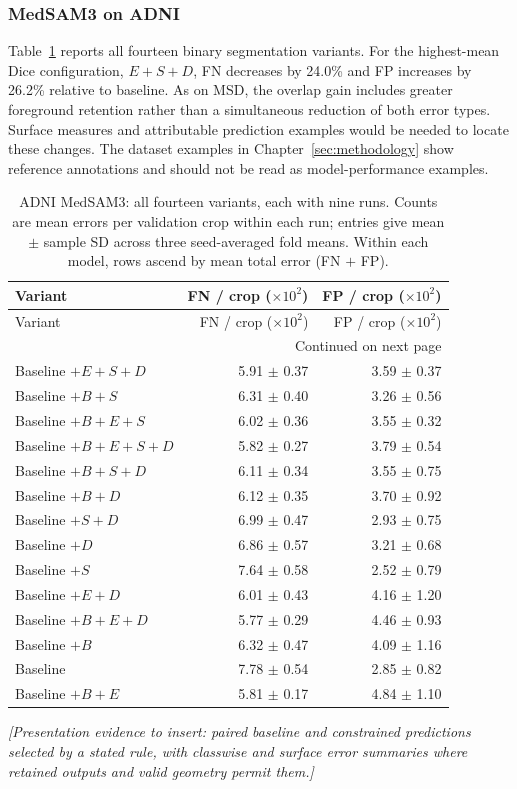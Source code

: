 \subsubsection{MedSAM3 on ADNI}

Table~\ref{tab:medsam-adni-all-errors} reports all fourteen binary
segmentation variants. For the highest-mean Dice configuration,
$E+S+D$, FN decreases by 24.0\% and FP increases by 26.2\% relative
to baseline. As on MSD, the overlap gain includes greater foreground
retention rather than a simultaneous reduction of both error types.
Surface measures and attributable prediction examples would be needed
to locate these changes. The dataset examples in
Chapter~\ref{sec:methodology} show reference annotations and should
not be read as model-performance examples.

\begingroup\footnotesize{}
\setlength{\tabcolsep}{4pt}
\renewcommand{\arraystretch}{1.12}
\begin{longtable}{@{}lrr@{}}
\caption{ADNI MedSAM3: all fourteen variants, each with nine runs. Counts are mean errors per validation crop within each run; entries give mean $\pm$ sample SD across three seed-averaged fold means. Within each model, rows ascend by mean total error (FN $+$ FP).}
\label{tab:medsam-adni-all-errors}\\
\hline
Variant & \shortstack{FN / crop\\($\times 10^{2}$)} & \shortstack{FP / crop\\($\times 10^{2}$)} \\ \hline
\endfirsthead
\hline
Variant & \shortstack{FN / crop\\($\times 10^{2}$)} & \shortstack{FP / crop\\($\times 10^{2}$)} \\ \hline
\endhead
\hline
\multicolumn{3}{r}{Continued on next page}\\
\endfoot
\hline\endlastfoot
Baseline $+E+S+D$ & 5.91 $\pm$ 0.37 & 3.59 $\pm$ 0.37 \\
Baseline $+B+S$ & 6.31 $\pm$ 0.40 & 3.26 $\pm$ 0.56 \\
Baseline $+B+E+S$ & 6.02 $\pm$ 0.36 & 3.55 $\pm$ 0.32 \\
Baseline $+B+E+S+D$ & 5.82 $\pm$ 0.27 & 3.79 $\pm$ 0.54 \\
Baseline $+B+S+D$ & 6.11 $\pm$ 0.34 & 3.55 $\pm$ 0.75 \\
Baseline $+B+D$ & 6.12 $\pm$ 0.35 & 3.70 $\pm$ 0.92 \\
Baseline $+S+D$ & 6.99 $\pm$ 0.47 & 2.93 $\pm$ 0.75 \\
Baseline $+D$ & 6.86 $\pm$ 0.57 & 3.21 $\pm$ 0.68 \\
Baseline $+S$ & 7.64 $\pm$ 0.58 & 2.52 $\pm$ 0.79 \\
Baseline $+E+D$ & 6.01 $\pm$ 0.43 & 4.16 $\pm$ 1.20 \\
Baseline $+B+E+D$ & 5.77 $\pm$ 0.29 & 4.46 $\pm$ 0.93 \\
Baseline $+B$ & 6.32 $\pm$ 0.47 & 4.09 $\pm$ 1.16 \\
Baseline & 7.78 $\pm$ 0.54 & 2.85 $\pm$ 0.82 \\
Baseline $+B+E$ & 5.81 $\pm$ 0.17 & 4.84 $\pm$ 1.10 \\
\end{longtable}
\endgroup

\noindent\textit{[Presentation evidence to insert: paired baseline and
constrained predictions selected by a stated rule, with classwise and
surface error summaries where retained outputs and valid geometry permit them.]}


